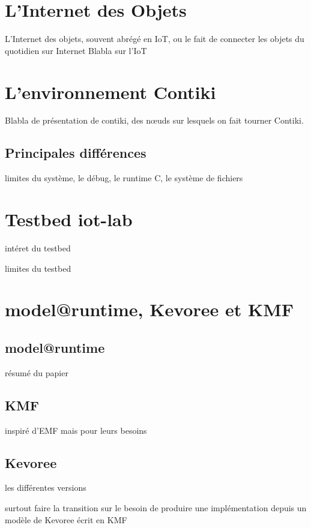 \section{L'Internet des Objets}

L'Internet des objets, souvent abrégé en IoT, ou le fait de connecter les objets du quotidien sur Internet  
Blabla sur l'IoT

\section{L'environnement Contiki}

Blabla de présentation de contiki, des nœuds sur lesquels on fait tourner Contiki.

\subsection{Principales différences}

limites du système, le débug, le runtime C, le système de fichiers


\section{Testbed iot-lab}

intéret du testbed

limites du testbed

\section{model@runtime, Kevoree et KMF}

\subsection{model@runtime}

résumé du papier

\subsection{KMF}

inspiré d'EMF mais pour leurs besoins

\subsection{Kevoree}

les différentes versions

surtout faire la transition sur le besoin de produire une implémentation depuis un modèle de Kevoree écrit en KMF